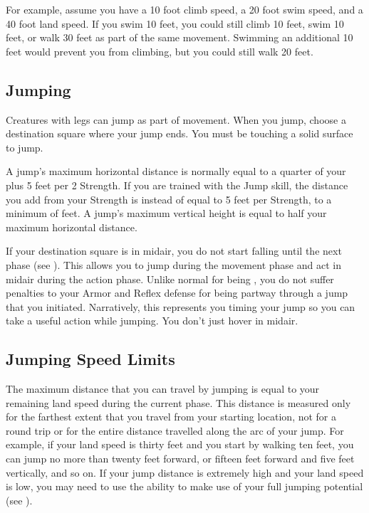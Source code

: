     For example, assume you have a 10 foot climb speed, a 20 foot swim speed, and a 40 foot land speed.
    If you swim 10 feet, you could still climb 10 feet, swim 10 feet, or walk 30 feet as part of the same movement.
    Swimming an additional 10 feet would prevent you from climbing, but you could still walk 20 feet.

  \subsection{Jumping}\label{Jumping}
    Creatures with legs can jump as part of movement.
    When you jump, choose a destination square where your jump ends.
    You must be touching a solid surface to jump.

    A jump's maximum horizontal distance is normally equal to a quarter of your  plus 5 feet per 2 Strength.
    If you are trained with the Jump skill, the distance you add from your Strength is instead of equal to 5 feet per Strength, to a minimum of  feet.
    A jump's maximum vertical height is equal to half your maximum horizontal distance.

    If your destination square is in midair, you do not start falling until the next phase (see ).
    This allows you to jump during the movement phase and act in midair during the action phase.
    Unlike normal for being , you do not suffer penalties to your Armor and Reflex defense for being partway through a jump that you initiated.
    Narratively, this represents you timing your jump so you can take a useful action while jumping.
    You don't just hover in midair.

  \subsection{Jumping Speed Limits}
    The maximum distance that you can travel by jumping is equal to your remaining land speed during the current phase.
    This distance is measured only for the farthest extent that you travel from your starting location, not for a round trip or for the entire distance travelled along the arc of your jump.
    For example, if your land speed is thirty feet and you start by walking ten feet, you can jump no more than twenty feet forward, or fifteen feet forward and five feet vertically, and so on.
    If your jump distance is extremely high and your land speed is low, you may need to use the  ability to make use of your full jumping potential (see ).

